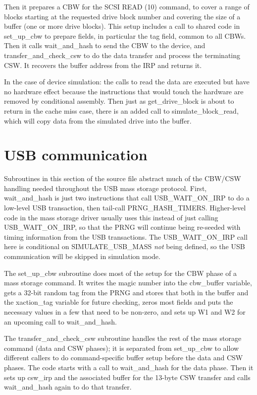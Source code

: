 Then it prepares a CBW for the SCSI READ (10) command, to cover a range
of blocks starting at the requested drive block number and covering the size
of a buffer (one or more drive blocks).  This setup includes a call to
shared code in set\_up\_cbw to prepare fields, in particular the tag field,
common to all CBWs.  Then it calls wait\_and\_hash to send the CBW to the
device, and transfer\_and\_check\_csw to do the data transfer and process
the terminating CSW.  It recovers the buffer address from the IRP and
returns it.

In the case of device simulation:  the calls to read the data are executed
but have no hardware effect because the instructions that would touch the
hardware are removed by conditional assembly.  Then just as
get\_drive\_block is about to return in the cache miss case, there is an
added call to simulate\_block\_read, which will copy data from the simulated
drive into the buffer.

\section{USB communication}

Subroutines in this section of the source file abstract much of the CBW/CSW
handling needed throughout the USB mass storage protocol.  First,
wait\_and\_hash is just two instructions that call USB\_WAIT\_ON\_IRP to do
a low-level USB transaction, then tail-call PRNG\_HASH\_TIMERS. 
Higher-level code in the mass storage driver usually uses this instead of
just calling USB\_WAIT\_ON\_IRP, so that the PRNG will continue being
re-seeded with timing information from the USB transactions.  The
USB\_WAIT\_ON\_IRP call here is conditional on SIMULATE\_USB\_MASS
\emph{not} being defined, so the USB communication will be skipped in
simulation mode.

The set\_up\_cbw subroutine does most of the setup for the CBW phase of a
mass storage command.  It writes the magic number into the cbw\_buffer
variable, gets a 32-bit random tag from the PRNG and stores that both in the
buffer and the xaction\_tag variable for future checking, zeros most fields
and puts the necessary values in a few that need to be non-zero, and sets up
W1 and W2 for an upcoming call to wait\_and\_hash.

The transfer\_and\_check\_csw subroutine handles the rest of the mass
storage command (data and CSW phases); it is separated from set\_up\_cbw to
allow different callers to do command-specific buffer setup before the data
and CSW phases.  The code starts with a call to wait\_and\_hash for the data
phase.  Then it sets up csw\_irp and the associated buffer for the 13-byte
CSW transfer and calls wait\_and\_hash again to do that transfer.

